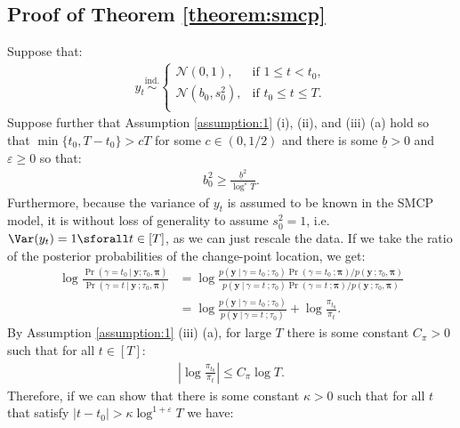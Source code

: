 \subsection{Proof of Theorem \ref{theorem:smcp}}
\label{app:localization-smcp}

Suppose that:
\begin{align*}
    y_t \overset{\text{ind.}}{\sim}
    \begin{cases}
        \mathcal{N}(0,1), &\text{if } 1 \leq t < t_0, \\
        \mathcal{N}(b_0,s_0^2), &\text{if } t_0 \leq t \leq T. \\
    \end{cases}
\end{align*}
Suppose further that Assumption \ref{assumption:1} (i), (ii), and (iii) (a) hold so that $\min\{t_0, T-t_0\} > cT$ for some $c \in (0,1/2)$ and there is some $\underline{b} > 0$ and $\varepsilon \geq 0$ so that:
\begin{align}\label{eq:thm1-b_0-bd}
    b^2_0 \geq \frac{\underline{b}^2}{\log^{\varepsilon} T}.
\end{align}
Furthermore, because the variance of $y_t$ is assumed to be known in the SMCP model, it is without loss of generality to assume $s_0^2 = 1$, i.e. $\Var(y_t) = 1 \sforall t \in [T]$, as we can just rescale the data. If we take the ratio of the posterior probabilities of the change-point location, we get:
\begin{align*}
    \log \frac{\Pr(\gamma = t_0  \:|\: \mathbf{y} ; \tau_0,\boldsymbol{\pi})}{\Pr(\gamma = t  \:|\: \mathbf{y} \:; \tau_0,\boldsymbol{\pi})} &=  \log \frac{p(\mathbf{y} \:|\:\gamma = t_0 \:; \tau_0)\Pr(\gamma = t_0 \:; \boldsymbol{\pi})/ p(\mathbf{y}\:;\tau_0,\boldsymbol{\pi})}{p(\mathbf{y} \:|\:\gamma = t \:; \tau_0)\Pr(\gamma = t \:;\boldsymbol{\pi})/ p(\mathbf{y}\:;\tau_0,\boldsymbol{\pi})} \tag{Bayes' rule} \\
    &= \log \frac{p(\mathbf{y} \:|\:\gamma = t_0 \:; \tau_0)}{p(\mathbf{y} \:|\:\gamma = t \:; \tau_0)} + \log \frac{\pi_{t_0}}{\pi_t}.
\end{align*}
By Assumption \ref{assumption:1} (iii) (a), for large $T$ there is some constant $C_\pi > 0$ such that for all $t \in [T]$: 
\begin{align}\label{eq:thm1-prior-bd}
    \left|\log \frac{\pi_{t_0}}{\pi_t}\right| \leq C_\pi \log T.
\end{align}
Therefore, if we can show that there is some constant $\kappa > 0$ such that for all $t$ that satisfy $|t - t_0| > \kappa\log^{1+\varepsilon} T$ we have:
